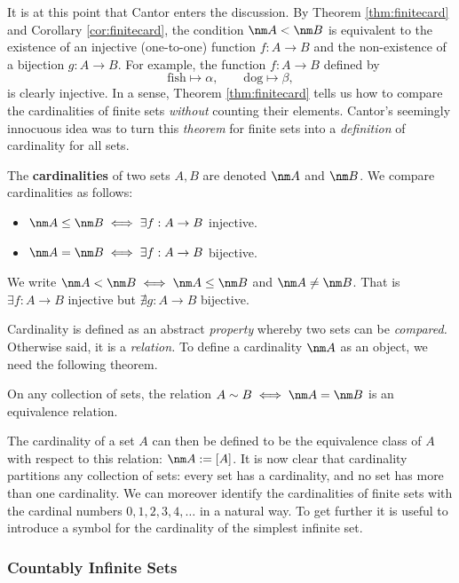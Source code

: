 It is at this point that Cantor enters the discussion. By Theorem \ref{thm:finitecard} and Corollary \ref{cor:finitecard}, the condition $\nm A<\nm B$ is equivalent to the existence of an injective (one-to-one) function $f:A\to B$ and the non-existence of a bijection $g:A\to B$. For example, the function $f:A\to B$ defined by
\[\text{fish}\longmapsto\alpha,\qquad\text{dog}\longmapsto\beta,\]
is clearly injective. In a sense, Theorem \ref{thm:finitecard} tells us how to compare the cardinalities of finite sets \emph{without} counting their elements. Cantor's seemingly innocuous idea was to turn this \emph{theorem} for finite sets into a \emph{definition} of cardinality for all sets.\pagebreak[4]

\begin{defn}\label{defn:infcard}
The \textbf{cardinalities} of two sets $A,B$ are denoted $\nm A$ and $\nm B$. We compare cardinalities as follows:
\begin{itemize}
  \item $\nm A\le\nm B\iff\exists f:A\to B$ injective.
  \item $\nm A=\nm B\iff\exists f:A\to B$ bijective.
\end{itemize}
We write $\nm A<\nm B\iff \nm A\le \nm B$ and $\nm A\neq \nm B$. That is $\exists f:A\to B$ injective but $\nexists g:A\to B$ bijective.
\end{defn}

\noindent Cardinality is defined as an abstract \emph{property} whereby two sets can be \emph{compared.} Otherwise said, it is a \emph{relation.} To define a cardinality $\nm A$ as an object, we need the following theorem.

\begin{thm}\label{thm:cardequiv}
On any collection of sets, the relation $A\sim B\iff\nm A=\nm B$ is an equivalence relation.
\end{thm}

\noindent The cardinality of a set $A$ can then be defined to be the equivalence class of $A$ with respect to this relation: $\nm A:=[A]$. It is now clear that cardinality partitions any collection of sets: every set has a cardinality, and no set has more than one cardinality. We can moreover identify the cardinalities of finite sets with the cardinal numbers $0,1,2,3,4,\ldots$ in a natural way. To get further it is useful to introduce a symbol for the cardinality of the simplest infinite set.

\subsubsection*{Countably Infinite Sets}

